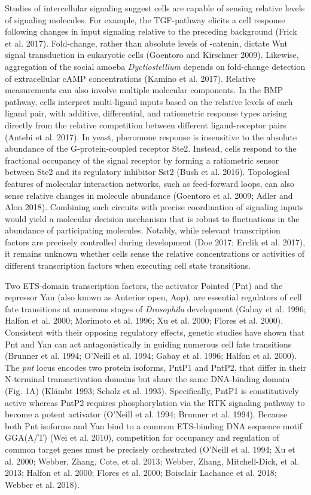 Studies of intercellular signaling suggest cells are capable of sensing relative levels of signaling molecules. For example, the TGF-\beta pathway elicits a cell response following changes in input signaling relative to the preceding background (Frick et al. 2017). Fold-change, rather than absolute levels of \beta-catenin, dictate Wnt signal transduction in eukaryotic cells (Goentoro and Kirschner 2009). Likewise, aggregation of the social amoeba \textit{Dyctiostellium} depends on fold-change detection of extracellular cAMP concentrations (Kamino et al. 2017). Relative measurements can also involve multiple molecular components. In the BMP pathway, cells interpret multi-ligand inputs based on the relative levels of each ligand pair, with additive, differential, and ratiometric response types arising directly from the relative competition between different ligand-receptor pairs (Antebi et al. 2017). In yeast, pheromone response is insensitive to the absolute abundance of the G‐protein‐coupled receptor Ste2. Instead, cells respond to the fractional occupancy of the signal receptor by forming a ratiometric sensor between Ste2 and its regulatory inhibitor Sst2 (Bush et al. 2016). Topological features of molecular interaction networks, such as feed-forward loops, can also sense relative changes in molecule abundance (Goentoro et al. 2009; Adler and Alon 2018). Combining such circuits with precise coordination of signaling inputs would yield a molecular decision mechanism that is robust to fluctuations in the abundance of participating molecules. Notably, while relevant transcription factors are precisely controlled during development (Doe 2017; Erclik et al. 2017), it remains unknown whether cells sense the relative concentrations or activities of different transcription factors when executing cell state transitions.

Two ETS-domain transcription factors, the activator Pointed (Pnt) and the repressor Yan (also known as Anterior open, Aop), are essential regulators of cell fate transitions at numerous stages of \textit{Drosophila} development (Gabay et al. 1996; Halfon et al. 2000; Morimoto et al. 1996; Xu et al. 2000; Flores et al. 2000). Consistent with their opposing regulatory effects, genetic studies have shown that Pnt and Yan can act antagonistically in guiding numerous cell fate transitions (Brunner et al. 1994; O'Neill et al. 1994; Gabay et al. 1996; Halfon et al. 2000). The \textit{pnt} locus encodes two protein isoforms, PntP1 and PntP2, that differ in their N-terminal transactivation domains but share the same DNA-binding domain (Fig. 1A) (Klämbt 1993; Scholz et al. 1993). Specifically, PntP1 is constitutively active whereas PntP2 requires phosphorylation via the RTK signaling pathway to become a potent activator (O'Neill et al. 1994; Brunner et al. 1994). Because both Pnt isoforms and Yan bind to a common ETS-binding DNA sequence motif GGA(A/T) (Wei et al. 2010), competition for occupancy and regulation of common target genes must be precisely orchestrated (O'Neill et al. 1994; Xu et al. 2000; Webber, Zhang, Cote, et al. 2013; Webber, Zhang, Mitchell-Dick, et al. 2013; Halfon et al. 2000; Flores et al. 2000; Boisclair Lachance et al. 2018; Webber et al. 2018).

